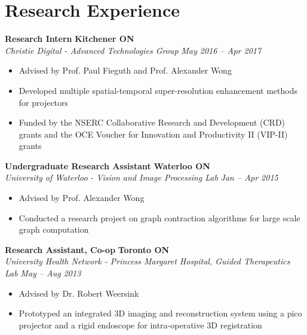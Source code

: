 \section*{Research Experience}
    \vspace{\postsubhead}
      \textbf{Research Intern}
      \hfill
      \textbf{Kitchener ON}\\
      \textit{Christie Digital - Advanced Technologies Group}
      \hfill
      \textit{May 2016 -- Apr 2017}
      \begin{itemize}
        \item Advised by Prof. Paul Fieguth and Prof. Alexander Wong
        \item Developed multiple spatial-temporal super-resolution enhancement methods for projectors
        \item Funded by the NSERC Collaborative Research and Development (CRD) grants and the OCE Voucher for Innovation and Productivity II (VIP-II) grants
      \end{itemize}
      \vspace{\interlist}
      \textbf{Undergraduate Research Assistant}
      \hfill
      \textbf{Waterloo ON}\\
      \textit{University of Waterloo - Vision and Image Processing Lab}
      \hfill
      \textit{Jan -- Apr 2015}
      \begin{itemize}
        \item Advised by Prof. Alexander Wong
        \item Conducted a research project on graph contraction algorithms for large scale graph computation
      \end{itemize}
      \vspace{\interlist}
      \textbf{Research Assistant, Co-op}
      \hfill
      \textbf{Toronto ON}\\
      \textit{University Health Network - Princess Margaret Hospital, Guided Therapeutics Lab}
      \hfill
      \textit{May -- Aug 2013}
      \begin{itemize}
        \item Advised by Dr. Robert Weersink
        \item Prototyped an integrated 3D imaging and reconstruction system using a pico projector and a rigid endoscope for intra-operative 3D registration
      \end{itemize}
      \vspace{\interlist}
